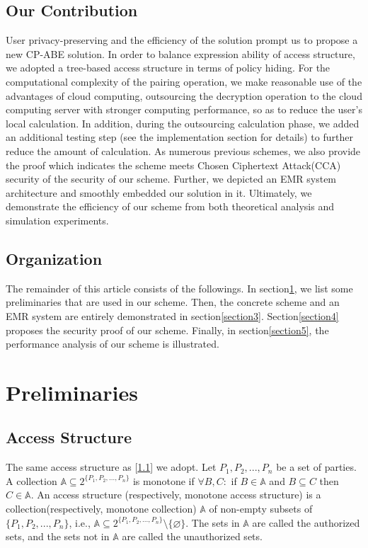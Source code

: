 \documentclass[smallextended]{svjour3}       %
\begin{document}
\subsection{Our Contribution}
	User privacy-preserving and the efficiency of the solution prompt us to propose a new CP-ABE solution. %
	In order to balance expression ability of access structure, we adopted a tree-based access structure in terms of policy hiding. 
	For the computational complexity of the pairing operation, we make reasonable use of the advantages of cloud computing, outsourcing the decryption operation to the cloud computing server with stronger computing performance, so as to reduce the user's local calculation. 
	In addition, during the outsourcing calculation phase, we added an additional testing step (see the implementation section for details) to further reduce the amount of calculation. 
	As numerous previous schemes, we also provide the proof which indicates the scheme meets Chosen Ciphertext Attack(CCA) security of the security of our scheme. 
	Further, we depicted an EMR system architecture and smoothly embedded our solution in it. 
	Ultimately, we demonstrate the efficiency of our scheme from both theoretical analysis and simulation experiments.

\subsection{Organization}
	The remainder of this article consists of the followings. 
	In section\ref{section2}, we list some preliminaries that are used in our scheme. 
	Then, the concrete scheme and an EMR system are entirely demonstrated in section\ref{section3}. 
	Section\ref{section4} proposes the security proof of our scheme. Finally, in section\ref{section5}, the performance analysis of our scheme is illustrated.


\section{Preliminaries}\label{section2}
\subsection{Access Structure}
	The same access structure as [\ref{}] we adopt. 
	Let ${P_1,P_2,...,P_n}$ be a set of parties.
	A collection $\mathbb{A}\subseteq 2^{\{P_1,P_2,...,P_n\}}$ is monotone if $\forall B,C:$ if $B\in \mathbb{A}$ and $B \subseteq C$ then $C \in \mathbb{A}$.
	An access structure (respectively, monotone access structure) is a collection(respectively, monotone collection) $\mathbb{A}$ of non-empty subsets of $\{P_1,P_2,...,P_n\}$, i.e., $\mathbb{A} \subseteq 2^{\{P_1,P_2,...,P_n\}}\setminus\{\varnothing \}$.
	The sets in $\mathbb{A}$ are called the authorized sets, and the sets not in $\mathbb{A}$ are called the unauthorized sets.
\end{document}
